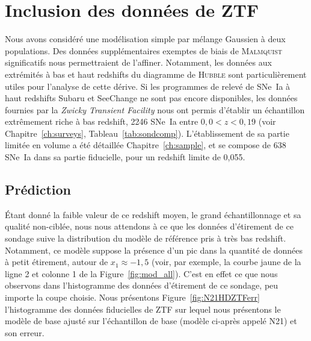 \documentclass[../main/main.tex]{subfiles}
\begin{document}
\section{Inclusion des données de ZTF}\label{sec:xztf}

Nous avons considéré une modélisation simple par mélange Gaussien à deux
populations. Des données supplémentaires exemptes de biais de \textsc{Malmquist}
significatifs nous permettraient de l'affiner. Notamment, les données aux
extrémités à bas et haut redshifts du diagramme de \textsc{Hubble} sont
particulièrement utiles pour l'analyse de cette dérive. Si les programmes de
relevé de SNe~Ia à haut redshifts Subaru et SeeChange ne sont pas encore
disponibles, les données fournies par la \textit{Zwicky Transient Facility}
\citep[ZTF,][]{bellm2019, graham2019} nous ont permis d'établir un échantillon
extrêmement riche à bas redshift, 2246 SNe~Ia entre $0,0 < z < 0,19$ (voir
Chapitre~\ref{ch:surveys}, Tableau~\ref{tab:sondcomp}). L'établissement de sa
partie limitée en volume a été détaillée Chapitre~\ref{ch:sample}, et se compose
de 638 SNe~Ia dans sa partie fiducielle, pour un redshift limite de 0,055.

\subsection{Prédiction}\label{ssec:xpred}

Étant donné la faible valeur de ce redshift moyen, le grand échantillonnage et
sa qualité non-ciblée, nous nous attendons à ce que les données d'étirement de
ce sondage suive la distribution du modèle de référence pris à très bas
redshift. Notamment, ce modèle suppose la présence d'un pic dans la quantité de
données à petit étirement, autour de $x_1 \approx -1,5$ (voir, par exemple, la
courbe jaune de la ligne 2 et colonne 1 de la Figure~\ref{fig:mod_all}). C'est
en effet ce que nous observons dans l'histogramme des données d'étirement de ce
sondage, peu importe la coupe choisie. Nous présentons
Figure~\ref{fig:N21HDZTFerr} l'histogramme des données fiducielles de ZTF sur
lequel nous présentons le modèle de base ajusté sur l'échantillon de base
(modèle ci-après appelé N21) et son erreur.
\end{document}
